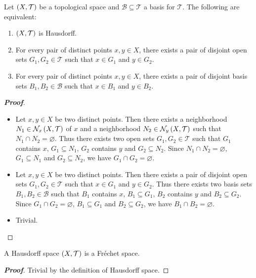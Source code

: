 \begin{proposition}
  Let $\left(X,\mathcal{T}\right)$ be a topological space and $\mathcal{B}\subseteq\mathcal{T}$ a basis for $\mathcal{T}$. The following are equivalent:

  \begin{enumerate}
    \item $\left(X,\mathcal{T}\right)$ is Hausdorff.
    \item For every pair of distinct points $x,y\in X$, there exists a pair of disjoint open sets $G_1,G_2\in\mathcal{T}$ such that $x\in G_1$ and $y\in G_2$.
    \item For every pair of distinct points $x,y\in X$, there exists a pair of disjoint basis sets $B_1,B_2\in\mathcal{B}$ such that $x\in B_1$ and $y\in B_2$.
  \end{enumerate}
  
  \begin{proof}[\rm\textbf{Proof}]
    \hfill
    \begin{itemize}
      \item[\boxed{1\Rightarrow2}] Let $x,y\in X$ be two distinct points. Then there exists a neighborhood $N_1\in\mathcal{N}_x\left(X,\mathcal{T}\right)$ of $x$ and a neighborhood $N_2\in\mathcal{N}_y\left(X,\mathcal{T}\right)$ such that $N_1\cap N_2=\varnothing$. Thus there exists two open sets $G_1,G_2\in\mathcal{T}$ such that $G_1$ contains $x$, $G_1\subseteq N_1$, $G_2$ contains $y$ and $G_2\subseteq N_2$. Since $N_1\cap N_2=\varnothing$, $G_1\subseteq N_1$ and $G_2\subseteq N_2$, we have $G_1\cap G_2=\varnothing$.
      \item[\boxed{2\Rightarrow3}] Let $x,y\in X$ be two distinct points. Then there exists a pair of disjoint open sets $G_1,G_2\in\mathcal{T}$ such that $x\in G_1$ and $y\in G_2$. Thus there exists two basis sets $B_1,B_2\in\mathcal{B}$ such that $B_1$ contains $x$, $B_1\subseteq G_1$, $B_2$ contains $y$ and $B_2\subseteq G_2$. Since $G_1\cap G_2=\varnothing$, $B_1\subseteq G_1$  and $B_2\subseteq G_2$, we have $B_1\cap B_2=\varnothing$.
      \item[\boxed{3\Rightarrow1}] Trivial.
    \end{itemize}
  \end{proof}
\end{proposition}

\begin{proposition}
  A Hausdorff space $\left(X,\mathcal{T}\right)$ is a Fréchet space.

  \begin{proof}[\rm\textbf{Proof}]
    Trivial by the definition of Hausdorff space.
  \end{proof}
\end{proposition}

